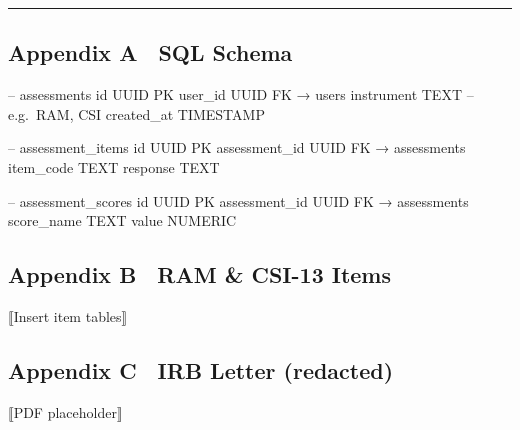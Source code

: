\documentclass[
]{article}
\begin{document}
\begin{center}\rule{0.5\linewidth}{0.5pt}\end{center}

\subsection{Appendix A SQL Schema}\label{appendix-a-sql-schema}

-- assessments id UUID PK user\_id UUID FK → users instrument TEXT --
e.g.~RAM, CSI created\_at TIMESTAMP

-- assessment\_items id UUID PK assessment\_id UUID FK → assessments
item\_code TEXT response TEXT

-- assessment\_scores id UUID PK assessment\_id UUID FK → assessments
score\_name TEXT value NUMERIC

\subsection{Appendix B RAM \& CSI-13
Items}\label{appendix-b-ram-csi-13-items}

⟦Insert item tables⟧

\subsection{Appendix C IRB Letter
(redacted)}\label{appendix-c-irb-letter-redacted}

⟦PDF placeholder⟧
\end{document}
